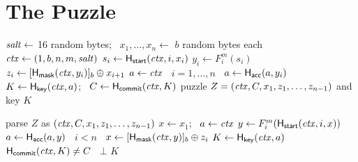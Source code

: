 \section{The Puzzle}\label{sec:construction}

\begin{algorithm}[t]
  \caption{$\Build(n, m, b)$, run by the sender}\label{alg:build}
  \begin{algorithmic}[1]
    \State $\mathit{salt} \gets$ 16 random bytes; \ $x_1, \dots, x_n \gets$ $b$ random bytes each
    \State $\mathit{ctx} \gets (1, b, n, m, \mathit{salt})$
    \label{line:build-for}
      \State $s_i \gets \mathsf{H}_{\mathsf{start}}(\mathit{ctx}, i, x_i)$
      \State $y_i \gets F_i^m(s_i)$ \label{line:build-chain}
    \EndFor
      \State $z_i \gets [\mathsf{H}_{\mathsf{mask}}(\mathit{ctx}, y_i)]_{b} \oplus x_{i+1}$ \label{line:build-mask}
    \EndFor
    \State $a \gets \mathit{ctx}$\label{line:build-acc}
    \State \algorithmicfor\ $i = 1, \dots, n$ \algorithmicdo\ $a \gets \mathsf{H}_{\mathsf{acc}}(a, y_i)$
    \State $K \gets \mathsf{H}_{\mathsf{key}}(\mathit{ctx}, a)$; \ $C \gets \mathsf{H}_{\mathsf{commit}}(\mathit{ctx}, K)$\label{line:build-key}
    \State \Return puzzle $Z = (\mathit{ctx}, C, x_1, z_1, \dots, z_{n-1})$ and key $K$
  \end{algorithmic}
\end{algorithm}

\begin{algorithm}[t]
  \caption{$\Open(Z)$, run by anyone}\label{alg:open}
  \begin{algorithmic}[1]
    \State parse $Z$ as $(\mathit{ctx}, C, x_1, z_1, \dots, z_{n-1})$
    \State $x \gets x_1$; \ $a \gets \mathit{ctx}$
     
      \State $y \gets F_i^m(\mathsf{H}_{\mathsf{start}}(\mathit{ctx}, i, x))$ 
      \State $a \gets \mathsf{H}_{\mathsf{acc}}(a, y)$ \label{line:open-acc}
      \State \algorithmicif\ $i < n$ \algorithmicthen\ $x \gets [\mathsf{H}_{\mathsf{mask}}(\mathit{ctx}, y)]_{b} \oplus z_i$ \label{line:open-mask}
    \EndFor
    \State $K \gets \mathsf{H}_{\mathsf{key}}(\mathit{ctx}, a)$
    \State \algorithmicif\ $\mathsf{H}_{\mathsf{commit}}(\mathit{ctx}, K) \neq C$ \algorithmicthen\ \Return $\bot$ \label{line:open-check}
    \State \Return $K$
  \end{algorithmic}
\end{algorithm}

